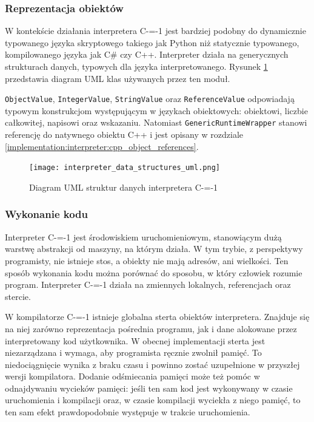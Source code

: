 \subsubsection{Reprezentacja obiektów}
\label{implementation:interpreter:object_representation}

W kontekście działania interpretera C-=-1 jest bardziej podobny do dynamicznie typowanego języka skryptowego takiego jak Python \cite{van1995python} niż statycznie typowanego, kompilowanego języka jak C\# czy C++.
Interpreter działa na generycznych strukturach danych, typowych dla języka interpretowanego.
Rysunek \ref{implementation:data_structures:uml_diagram} przedstawia diagram UML klas używanych przez ten moduł.

\lstinline{ObjectValue}, \lstinline{IntegerValue}, \lstinline{StringValue} oraz \lstinline{ReferenceValue} odpowiadają typowym konstrukcjom występującym w językach obiektowych: obiektowi, liczbie całkowitej, napisowi oraz wskazaniu.
Natomiast \lstinline{GenericRuntimeWrapper} stanowi referencję do natywnego obiektu C++ i jest opisany w rozdziale \ref{implementation:interpreter:cpp_object_references}.


\begin{figure}
  \caption{Diagram UML struktur danych interpretera C-=-1}
  \label{implementation:data_structures:uml_diagram}
  \texttt{[image: interpreter\_data\_structures\_uml.png]}
\end{figure}

\subsubsection{Wykonanie kodu}
\label{implementation:interpreter:code_execution}

Interpreter C-=-1 jest środowiskiem uruchomieniowym, stanowiącym dużą warstwę abstrakcji od maszyny, na którym działa.
W tym trybie, z perspektywy programisty, nie istnieje stos, a obiekty nie mają adresów, ani wielkości.
Ten sposób wykonania kodu można porównać do sposobu, w który człowiek rozumie program.
Interpreter C-=-1 działa na zmiennych lokalnych, referencjach oraz stercie.

W kompilatorze C-=-1 istnieje globalna sterta obiektów interpretera.
Znajduje się na niej zarówno reprezentacja pośrednia programu, jak i dane alokowane przez interpretowany kod użytkownika.
W obecnej implementacji sterta jest niezarządzana i wymaga, aby programista ręcznie zwolnił pamięć.
To niedociągnięcie wynika z braku czasu i powinno zostać uzupełnione w przyszłej wersji kompilatora.
Dodanie odśmiecania pamięci może też pomóc w odnajdywaniu wycieków pamięci: jeśli ten sam kod jest wykonywany w czasie uruchomienia i kompilacji oraz, w czasie kompilacji wyciekła z niego pamięć, to ten sam efekt prawdopodobnie występuje w trakcie uruchomienia.

